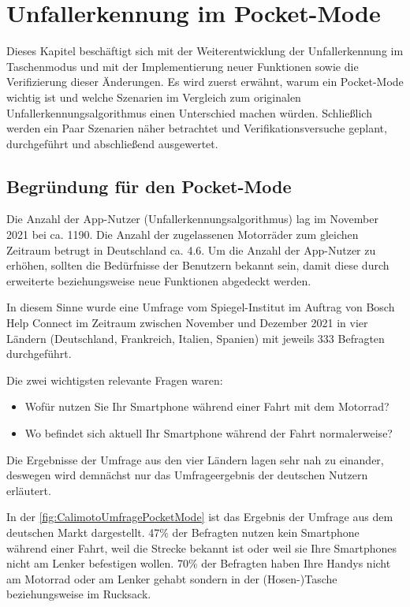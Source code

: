 \chapter{Unfallerkennung im Pocket-Mode}
Dieses Kapitel beschäftigt sich mit der Weiterentwicklung der Unfallerkennung im Taschenmodus und mit der Implementierung neuer Funktionen sowie die Verifizierung dieser Änderungen. Es wird zuerst erwähnt, warum ein Pocket-Mode wichtig ist und welche Szenarien im Vergleich zum originalen Unfallerkennungsalgorithmus einen Unterschied machen würden.
Schließlich werden ein Paar Szenarien näher betrachtet und Verifikationsversuche geplant, durchgeführt und abschließend ausgewertet.

\section{Begründung für den Pocket-Mode}
Die Anzahl der App-Nutzer (Unfallerkennungsalgorithmus) lag im November 2021 bei ca. 1190. Die Anzahl der zugelassenen Motorräder zum gleichen Zeitraum betrugt in Deutschland ca. \SI{4,6}{\Million}. Um die Anzahl der App-Nutzer zu erhöhen, sollten die Bedürfnisse der Benutzern bekannt sein, damit diese durch erweiterte beziehungsweise neue Funktionen abgedeckt werden.

In diesem Sinne wurde eine Umfrage vom Spiegel-Institut im Auftrag von Bosch Help Connect im Zeitraum zwischen November und Dezember 2021 in vier Ländern (Deutschland, Frankreich, Italien, Spanien) mit jeweils 333 Befragten durchgeführt.

Die zwei wichtigsten relevante Fragen waren:
\begin{itemize}
	\item Wofür nutzen Sie Ihr Smartphone während einer Fahrt mit dem Motorrad?
	\item Wo befindet sich aktuell Ihr Smartphone während der Fahrt normalerweise?
\end{itemize}

Die Ergebnisse der Umfrage aus den vier Ländern lagen sehr nah zu einander, deswegen wird demnächst nur das Umfrageergebnis der deutschen Nutzern erläutert.

In der \autoref{fig:CalimotoUmfragePocketMode} ist das Ergebnis der Umfrage aus dem deutschen Markt dargestellt. 47\% der Befragten nutzen kein Smartphone während einer Fahrt, weil die Strecke bekannt ist oder weil sie Ihre Smartphones nicht am Lenker befestigen wollen. 70\% der Befragten haben Ihre Handys nicht am Motorrad oder am Lenker gehabt sondern in der (Hosen-)Tasche beziehungsweise im Rucksack. 

